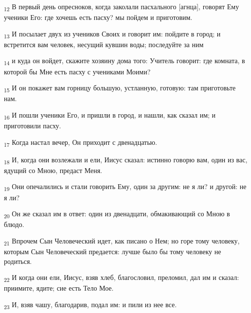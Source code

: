 \begin{tcolorbox}
\textsubscript{12} В первый день опресноков, когда заколали пасхального [агнца], говорят Ему ученики Его: где хочешь есть пасху? мы пойдем и приготовим.
\end{tcolorbox}
\begin{tcolorbox}
\textsubscript{13} И посылает двух из учеников Своих и говорит им: пойдите в город; и встретится вам человек, несущий кувшин воды; последуйте за ним
\end{tcolorbox}
\begin{tcolorbox}
\textsubscript{14} и куда он войдет, скажите хозяину дома того: Учитель говорит: где комната, в которой бы Мне есть пасху с учениками Моими?
\end{tcolorbox}
\begin{tcolorbox}
\textsubscript{15} И он покажет вам горницу большую, устланную, готовую: там приготовьте нам.
\end{tcolorbox}
\begin{tcolorbox}
\textsubscript{16} И пошли ученики Его, и пришли в город, и нашли, как сказал им; и приготовили пасху.
\end{tcolorbox}
\begin{tcolorbox}
\textsubscript{17} Когда настал вечер, Он приходит с двенадцатью.
\end{tcolorbox}
\begin{tcolorbox}
\textsubscript{18} И, когда они возлежали и ели, Иисус сказал: истинно говорю вам, один из вас, ядущий со Мною, предаст Меня.
\end{tcolorbox}
\begin{tcolorbox}
\textsubscript{19} Они опечалились и стали говорить Ему, один за другим: не я ли? и другой: не я ли?
\end{tcolorbox}
\begin{tcolorbox}
\textsubscript{20} Он же сказал им в ответ: один из двенадцати, обмакивающий со Мною в блюдо.
\end{tcolorbox}
\begin{tcolorbox}
\textsubscript{21} Впрочем Сын Человеческий идет, как писано о Нем; но горе тому человеку, которым Сын Человеческий предается: лучше было бы тому человеку не родиться.
\end{tcolorbox}
\begin{tcolorbox}
\textsubscript{22} И когда они ели, Иисус, взяв хлеб, благословил, преломил, дал им и сказал: приимите, ядите; сие есть Тело Мое.
\end{tcolorbox}
\begin{tcolorbox}
\textsubscript{23} И, взяв чашу, благодарив, подал им: и пили из нее все.
\end{tcolorbox}

